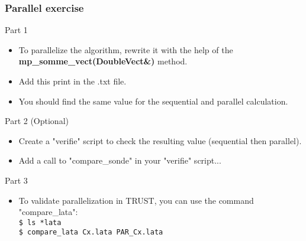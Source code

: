 \documentclass[10pt, hyperref={unicode=true,pdfusetitle, bookmarks=true,bookmarksnumbered=false,bookmarksopen=false, breaklinks=false,pdfborder={0 0 1},backref=true,colorlinks=true,linkcolor=darkblue,pageanchor, urlcolor=darkblue}]{beamer}
\begin{document}
\begin{frame}
\frametitle{Parallel exercise}

\begin{block}{Part 1}
\begin{itemize}
\item To parallelize the algorithm, rewrite it with the help of the \textbf{mp\_somme\_vect(DoubleVect\&)} method.

\item Add this print in the .txt file.

\item You should find the same value for the sequential and parallel calculation.
\end{itemize}
\end{block}

\begin{block}{Part 2 (Optional)}
\begin{itemize}
\item Create a "verifie" script to check the resulting value (sequential then parallel).

\item Add a call to "compare\_sonde" in your "verifie" script...
\end{itemize}
\end{block}

\begin{block}{Part 3}
\begin{itemize}
\item To validate parallelization in TRUST, you can use the command "compare\_lata":\\
\texttt{\$ ls *lata }\\
\texttt{\$ compare\_lata  Cx.lata  PAR\_Cx.lata }
\end{itemize}
\end{block}

\end{frame}
\end{document}

